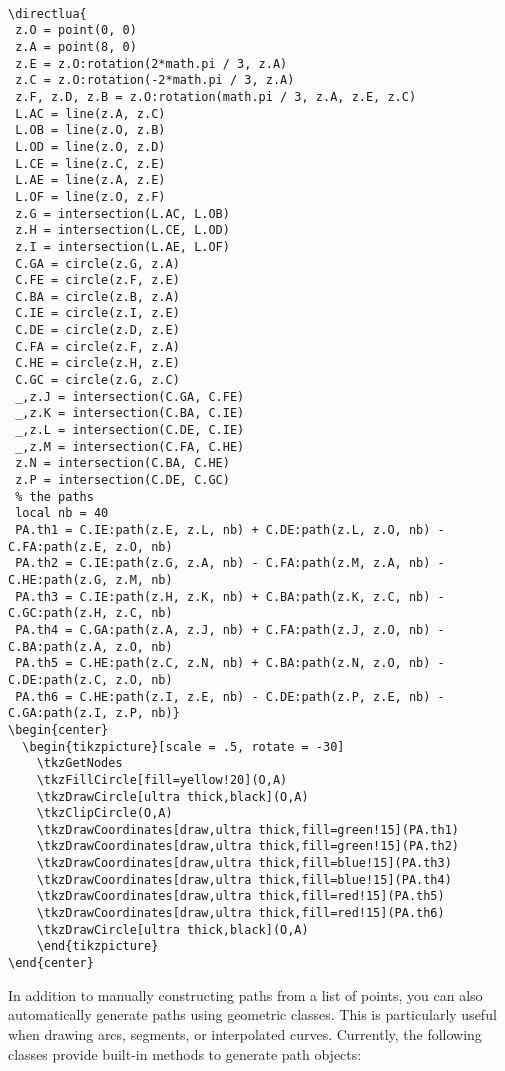 {\begin{verbatim}

\directlua{
 z.O = point(0, 0)
 z.A = point(8, 0)
 z.E = z.O:rotation(2*math.pi / 3, z.A)
 z.C = z.O:rotation(-2*math.pi / 3, z.A)
 z.F, z.D, z.B = z.O:rotation(math.pi / 3, z.A, z.E, z.C)
 L.AC = line(z.A, z.C)
 L.OB = line(z.O, z.B)
 L.OD = line(z.O, z.D)
 L.CE = line(z.C, z.E)
 L.AE = line(z.A, z.E)
 L.OF = line(z.O, z.F)
 z.G = intersection(L.AC, L.OB)
 z.H = intersection(L.CE, L.OD)
 z.I = intersection(L.AE, L.OF)
 C.GA = circle(z.G, z.A)
 C.FE = circle(z.F, z.E)
 C.BA = circle(z.B, z.A)
 C.IE = circle(z.I, z.E)
 C.DE = circle(z.D, z.E)
 C.FA = circle(z.F, z.A)
 C.HE = circle(z.H, z.E)
 C.GC = circle(z.G, z.C)
 _,z.J = intersection(C.GA, C.FE)
 _,z.K = intersection(C.BA, C.IE)
 _,z.L = intersection(C.DE, C.IE)
 _,z.M = intersection(C.FA, C.HE)
 z.N = intersection(C.BA, C.HE)
 z.P = intersection(C.DE, C.GC)
 % the paths
 local nb = 40
 PA.th1 = C.IE:path(z.E, z.L, nb) + C.DE:path(z.L, z.O, nb) - C.FA:path(z.E, z.O, nb)
 PA.th2 = C.IE:path(z.G, z.A, nb) - C.FA:path(z.M, z.A, nb) - C.HE:path(z.G, z.M, nb)
 PA.th3 = C.IE:path(z.H, z.K, nb) + C.BA:path(z.K, z.C, nb) - C.GC:path(z.H, z.C, nb)
 PA.th4 = C.GA:path(z.A, z.J, nb) + C.FA:path(z.J, z.O, nb) - C.BA:path(z.A, z.O, nb)
 PA.th5 = C.HE:path(z.C, z.N, nb) + C.BA:path(z.N, z.O, nb) - C.DE:path(z.C, z.O, nb)
 PA.th6 = C.HE:path(z.I, z.E, nb) - C.DE:path(z.P, z.E, nb) - C.GA:path(z.I, z.P, nb)}
\begin{center}
  \begin{tikzpicture}[scale = .5, rotate = -30]
    \tkzGetNodes
    \tkzFillCircle[fill=yellow!20](O,A)
    \tkzDrawCircle[ultra thick,black](O,A)
    \tkzClipCircle(O,A)
    \tkzDrawCoordinates[draw,ultra thick,fill=green!15](PA.th1)
    \tkzDrawCoordinates[draw,ultra thick,fill=green!15](PA.th2)
    \tkzDrawCoordinates[draw,ultra thick,fill=blue!15](PA.th3)
    \tkzDrawCoordinates[draw,ultra thick,fill=blue!15](PA.th4)
    \tkzDrawCoordinates[draw,ultra thick,fill=red!15](PA.th5)
    \tkzDrawCoordinates[draw,ultra thick,fill=red!15](PA.th6)
    \tkzDrawCircle[ultra thick,black](O,A)
    \end{tikzpicture}
\end{center}

\end{verbatim}

\medskip

In addition to manually constructing paths from a list of points, you can also automatically generate paths using geometric classes. This is particularly useful when drawing arcs, segments, or interpolated curves. Currently, the following classes provide built-in methods to generate path objects:

}
